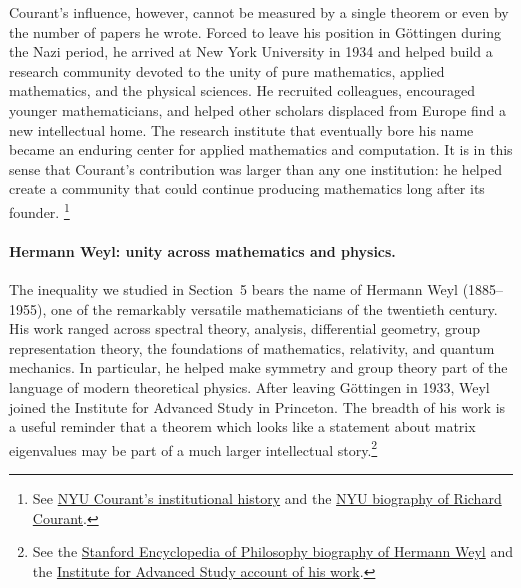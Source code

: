 \documentclass[14pt,letterpaper]{article}
\theoremstyle{plain}
\theoremstyle{definition}
\theoremstyle{remark}
\begin{document}
Courant's influence, however, cannot be measured by a
single theorem or even by the number of papers he wrote.
Forced to leave his position in G\"ottingen during the Nazi
period, he arrived at New York University in 1934 and
helped build a research community devoted to the unity of
pure mathematics, applied mathematics, and the physical
sciences. He recruited colleagues, encouraged younger
mathematicians, and helped other scholars displaced from
Europe find a new intellectual home. The research institute
that eventually bore his name became an enduring center
for applied mathematics and computation. It is in this
sense that Courant's contribution was larger than any one
institution: he helped create a community that could
continue producing mathematics long after its founder.
\footnote{See
\href{https://cims.nyu.edu/dynamic/about/history/}{NYU Courant's institutional history}
and the
\href{https://cims.nyu.edu/about/courant_bio.html}{NYU biography of Richard Courant}.}

\paragraph{Hermann Weyl: unity across mathematics and physics.}
The inequality we studied in Section~5 bears the name of
Hermann Weyl (1885--1955), one of the remarkably versatile
mathematicians of the twentieth century. His work ranged
across spectral theory, analysis, differential geometry,
group representation theory, the foundations of mathematics,
relativity, and quantum mechanics. In particular, he helped
make symmetry and group theory part of the language of
modern theoretical physics. After leaving G\"ottingen in
1933, Weyl joined the Institute for Advanced Study in
Princeton. The breadth of his work is a useful reminder
that a theorem which looks like a statement about matrix
eigenvalues may be part of a much larger intellectual
story.\footnote{See the
\href{https://plato.stanford.edu/entries/weyl/}{Stanford Encyclopedia of Philosophy biography of Hermann Weyl}
and the
\href{https://www.ias.edu/hermann-weyl-work}{Institute for Advanced Study account of his work}.}
\end{document}
